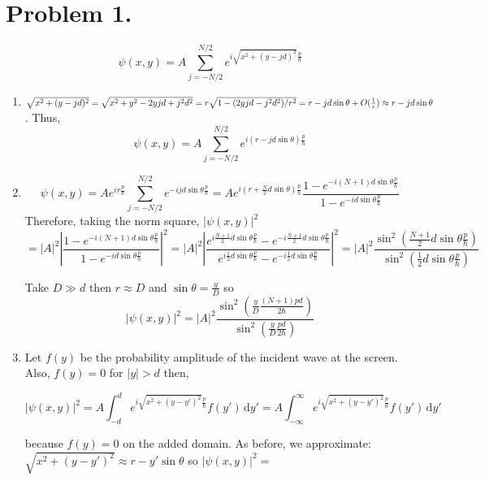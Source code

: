 \documentclass[12pt]{extarticle}
\begin{document}
 
\section*{Problem 1.}
 \[\psi(x, y) = A \sum_{j = -N/2}^{N/2} e^{i \sqrt{x^2 + (y - jd)^2} \frac{p}{\hbar}} \]
\begin{enumerate}
\item $\sqrt{x^2 + (y - jd)^2} = \sqrt{x^2 + y^2 - 2yjd + j^2d^2} = r \sqrt{1 - (2yjd - j^2 d^2)/r^2} =  \\ r - jd \sin{\theta} + O(\frac{1}{r}) \approx r - jd \sin{\theta}$. Thus,  \[\psi(x, y) = A \sum_{j = -N/2}^{N/2} e^{i (r - jd \sin{\theta}) \frac{p}{\hbar}} \]

\item \[\psi(x, y) = A e^{ir \frac{p}{\hbar}} \sum_{j = -N/2}^{N/2} e^{- i jd \sin{\theta} \frac{p}{\hbar}} = A e^{i(r + \frac{N}{2} d \sin{\theta}) \frac{p}{\hbar}}  \frac{1 - e^{-i(N+1)d \sin{\theta} \frac{p}{\hbar}}}{1 - e^{-id \sin{\theta} \frac{p}{\hbar}}}  \]
Therefore, taking the norm square, $ \left| \psi(x,y) \right|^2 $
\[ = \left| A \right|^2 \left | \frac{1 - e^{-i(N+1)d \sin{\theta} \frac{p}{\hbar}}}{1 - e^{-id \sin{\theta} \frac{p}{\hbar}}}  \right|^2 = \left| A \right|^2 \left | \frac{e^{i\frac{N+1}{2}d \sin{\theta} \frac{p}{\hbar}} - e^{-i\frac{N+1}{2}d \sin{\theta} \frac{p}{\hbar}}}{e^{i \frac{1}{2} d \sin{\theta} \frac{p}{\hbar}} - e^{-i \frac{1}{2} d \sin{\theta} \frac{p}{\hbar}}}  \right|^2  = \left| A \right|^2 \frac{\sin^2{\left( \frac{N+1}{2}d \sin{\theta} \frac{p}{\hbar}\right)}}{\sin^2{\left(  \frac{1}{2} d \sin{\theta} \frac{p}{\hbar} \right)}} \] 

Take $D \gg d$ then $r \approx D$ and $\sin{\theta} = \frac{y}{D}$ so \[ \left| \psi(x,y) \right|^2 = \left| A \right|^2 \frac{\sin^2{\left(\frac{y}{D} \frac{(N+1)pd}{2\hbar} \right)}}{\sin^2{\left( \frac{y}{D} \frac{pd}{2\hbar} \right)}}  \] 

\item Let $f(y)$ be the probability amplitude of the incident wave at the screen. Also, $f(y) = 0$ for $|y| > d$ then,

\[ \left| \psi(x,y) \right|^2 = A \int_{-d}^{d} e^{i \sqrt{x^2 + (y-y')^2} \frac{p}{\hbar}} f(y')  \, \mathrm{d} y'  = A \int_{-\infty}^{\infty} e^{i \sqrt{x^2 + (y-y')^2} \frac{p}{\hbar}} f(y')  \, \mathrm{d} y' \] 

because $f(y) = 0$ on the added domain. As before, we approximate: $\sqrt{x^2 + (y-y')^2} \approx r - y' \sin{\theta}$ so $\left| \psi(x,y) \right|^2 =$



\end{enumerate}
\end{document}
